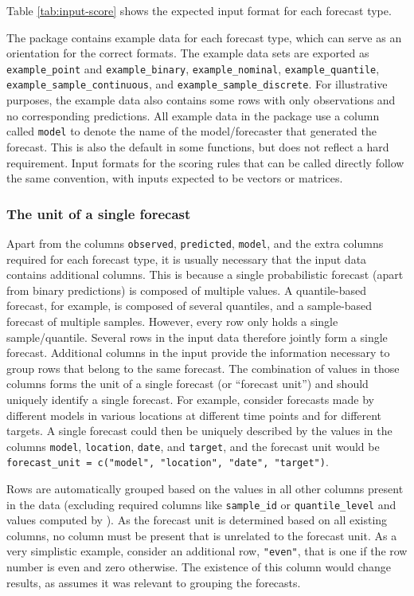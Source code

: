 \documentclass[
]{jss}
\begin{document}
Table \ref{tab:input-score} shows the expected input format for each
forecast type.

The package contains example data for each forecast type, which can
serve as an orientation for the correct formats. The example data sets
are exported as \texttt{example\_point} and \texttt{example\_binary},
\texttt{example\_nominal}, \texttt{example\_quantile},
\texttt{example\_sample\_continuous}, and
\texttt{example\_sample\_discrete}. For illustrative purposes, the
example data also contains some rows with only observations and no
corresponding predictions. All example data in the package use a column
called \texttt{model} to denote the name of the model/forecaster that
generated the forecast. This is also the default in some functions, but
does not reflect a hard requirement. Input formats for the scoring rules
that can be called directly follow the same convention, with inputs
expected to be vectors or matrices.

\subsubsection{The unit of a single
forecast}\label{the-unit-of-a-single-forecast}

Apart from the columns \texttt{observed}, \texttt{predicted},
\texttt{model}, and the extra columns required for each forecast type,
it is usually necessary that the input data contains additional columns.
This is because a single probabilistic forecast (apart from binary
predictions) is composed of multiple values. A quantile-based forecast,
for example, is composed of several quantiles, and a sample-based
forecast of multiple samples. However, every row only holds a single
sample/quantile. Several rows in the input data therefore jointly form a
single forecast. Additional columns in the input provide the information
necessary to group rows that belong to the same forecast. The
combination of values in those columns forms the unit of a single
forecast (or ``forecast unit'') and should uniquely identify a single
forecast. For example, consider forecasts made by different models in
various locations at different time points and for different targets. A
single forecast could then be uniquely described by the values in the
columns \texttt{model}, \texttt{location}, \texttt{date}, and
\texttt{target}, and the forecast unit would be
\texttt{forecast\_unit\ =\ c("model",\ "location",\ "date",\ "target")}.

Rows are automatically grouped based on the values in all other columns
present in the data (excluding required columns like \texttt{sample\_id}
or \texttt{quantile\_level} and values computed by ).
As the forecast unit is determined based on all existing columns, no
column must be present that is unrelated to the forecast unit. As a very
simplistic example, consider an additional row, \texttt{"even"}, that is
one if the row number is even and zero otherwise. The existence of this
column would change results, as  assumes it was
relevant to grouping the forecasts.
\end{document}
